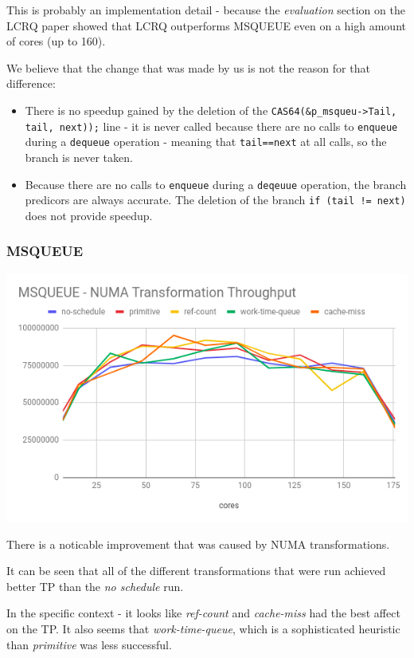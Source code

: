 \documentclass{article}
\begin{document}
 This is probably an implementation detail - because the \textit{evaluation} section on the LCRQ paper\cite{LCRQ} showed that LCRQ outperforms MSQUEUE even on a high amount of cores (up to 160).

 We believe that the change that was made by us is not the reason for that difference: 

 \begin{itemize}
   \item There is no speedup gained by the deletion of the \lstinline{CAS64(&p_msqueu->Tail, tail, next));} line  - it is never called because there are no calls to \lstinline{enqueue} during a \lstinline{dequeue} operation - meaning that \lstinline{tail==next} at all calls, so the branch is never taken.
   \item Because there are no calls to \lstinline{enqueue} during a \lstinline{deqeuue} operation, the branch predicors are always accurate. The deletion of the branch \lstinline{if (tail != next)} does not provide speedup.
 \end{itemize}
 

 \subsubsection{MSQUEUE}

 \includegraphics[width=\textwidth]{graph-msqueue.png}

 There is a noticable improvement that was caused by NUMA transformations. 
 
 It can be seen that all of the different transformations that were run achieved better TP than the \textit{no schedule} run. 

 In the specific context - it looks like \textit{ref-count} and \textit{cache-miss} had the best affect on the TP. It also seems that \textit{work-time-queue}, which is a sophisticated heuristic than \textit{primitive} was less successful.
\end{document}
